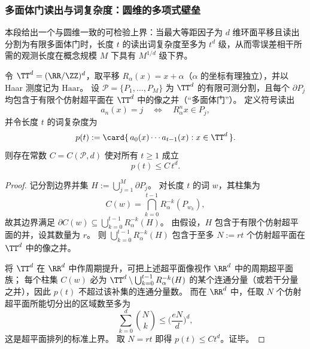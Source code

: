 \subsubsection{多面体门读出与词复杂度：圆维的多项式壁垒}\label{subsubsec:cdim-polyhedral-gate-word-complexity}
本段给出一个与圆维一致的可检验上界：当最大等距因子为 \(d\) 维环面平移且读出分割为有限多面体门时，长度 \(t\) 的读出词复杂度至多为 \(t^d\) 级，从而零误差相干所需的观测长度在概念规模 \(M\) 下具有 \(M^{1/d}\) 级下界。

\begin{theorem}[多面体门编码的词复杂度上界]\label{thm:cdim-polyhedral-gate-word-complexity-td}
令 \(\TT^d=(\RR/\ZZ)^d\)，取平移 \(R_\alpha(x)=x+\alpha\)（\(\alpha\) 的坐标有理独立），并以 Haar 测度记为 \(\mathrm{Haar}\)。
设 \(\mathcal P=\{P_1,\dots,P_M\}\) 为 \(\TT^d\) 的有限可测分割，且每个 \(\partial P_j\) 均包含于有限个仿射超平面在 \(\TT^d\) 中的像之并（“多面体门”）。
定义符号读出
\[
a_n(x)=j\quad\Longleftrightarrow\quad R_\alpha^n x\in P_j,
\]
并令长度 \(t\) 的词复杂度为
\[
p(t):=\card\{\,a_0(x)\cdots a_{t-1}(x):x\in\TT^d\,\}.
\]
则存在常数 \(C=C(\mathcal P,d)\) 使对所有 \(t\ge 1\) 成立
\[
p(t)\le C\,t^d.
\]
\end{theorem}
\begin{proof}
记分割边界并集 \(H:=\bigcup_{j=1}^M\partial P_j\)。
对长度 \(t\) 的词 \(w\)，其柱集为
\[
C(w)=\bigcap_{k=0}^{t-1}R_\alpha^{-k}(P_{w_k}),
\]
故其边界满足
\(
\partial C(w)\subseteq \bigcup_{k=0}^{t-1}R_\alpha^{-k}(H)
\)。
由假设，\(H\) 包含于有限个仿射超平面的并，设其数量为 \(r\)。
则 \(\bigcup_{k=0}^{t-1}R_\alpha^{-k}(H)\) 包含于至多 \(N:=rt\) 个仿射超平面在 \(\TT^d\) 中的像之并。
\par
将 \(\TT^d\) 在 \(\RR^d\) 中作周期提升，可把上述超平面像视作 \(\RR^d\) 中的周期超平面族；
每个柱集 \(C(w)\) 必为 \(\TT^d\setminus \bigcup_{k=0}^{t-1}R_\alpha^{-k}(H)\) 的某个连通分量（或若干分量之并），因此 \(p(t)\) 不超过该补集的连通分量数。
而在 \(\RR^d\) 中，任取 \(N\) 个仿射超平面所能切分出的区域数至多为
\[
\sum_{k=0}^{d}\binom{N}{k}\le \Big(\frac{eN}{d}\Big)^d,
\]
这是超平面排列的标准上界。
取 \(N=rt\) 即得 \(p(t)\le C t^d\)。证毕。
\end{proof}

